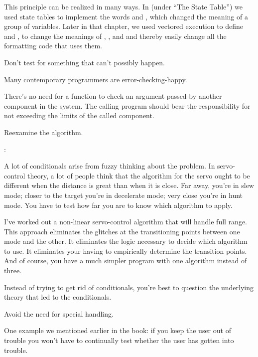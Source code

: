 This principle can be realized in many ways. In  (under ``The
State Table'') we used state tables to implement the words 
and , which changed the meaning of a group of variables.
Later in that chapter, we used vectored execution to define
 and , to change the meanings of
, ,  and  and thereby
easily change all the formatting code that uses them.

\begin{tip}
Don't test for something that can't possibly happen.
\end{tip}
Many contemporary programmers are error-checking-happy.

There's no need for a function to check an argument passed by
another component in the system. The calling program should bear the
responsibility for not exceeding the limits of the called component.
%
\begin{tip}
Reexamine the algorithm.
\end{tip}
\begin{interview}
:
\begin{tfquot}
A lot of conditionals arise from fuzzy thinking about the problem. In
servo-control theory, a lot of people think that the algorithm for the
servo ought to be different when the distance is great than when it is
close. Far away, you're in slew mode; closer to the target you're in
decelerate mode; very close you're in hunt mode. You have to test how far
you are to know which algorithm to apply.

I've worked out a non-linear servo-control algorithm that will handle full
range. This approach eliminates the glitches at the transitioning points
between one mode and the other. It eliminates the logic necessary to decide
which algorithm to use. It eliminates your having to empirically determine
the transition points. And of course, you have a much simpler program with
one algorithm instead of three.

Instead of trying to get rid of conditionals, you're best to question the
underlying theory that led to the conditionals.
\end{tfquot}
\end{interview}%
\begin{tip}
Avoid the need for special handling.
\end{tip}
One example we mentioned earlier in the book: if you keep the user out of
trouble you won't have to continually test whether the user has gotten
into trouble.

